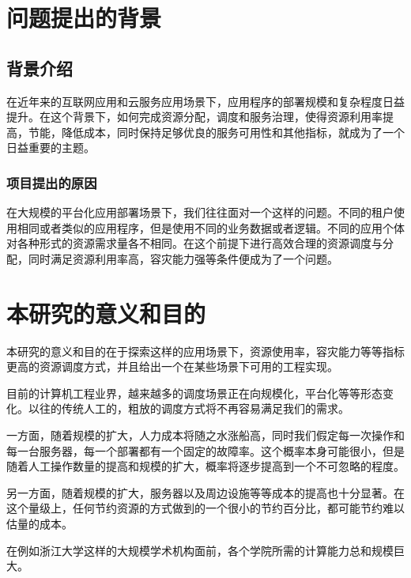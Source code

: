 \section{问题提出的背景}


\subsection{背景介绍}

在近年来的互联网应用和云服务应用场景下，应用程序的部署规模和复杂程度日益提升。在这个背景下，如何完成资源分配，调度和服务治理，使得资源利用率提高，节能，降低成本，同时保持足够优良的服务可用性和其他指标，就成为了一个日益重要的主题。

\subsubsection{项目提出的原因}

在大规模的平台化应用部署场景下，我们往往面对一个这样的问题。不同的租户使用相同或者类似的应用程序，但是使用不同的业务数据或者逻辑。不同的应用个体对各种形式的资源需求量各不相同。在这个前提下进行高效合理的资源调度与分配，同时满足资源利用率高，容灾能力强等条件便成为了一个问题。

\section{本研究的意义和目的}

本研究的意义和目的在于探索这样的应用场景下，资源使用率，容灾能力等等指标更高的资源调度方式，并且给出一个在某些场景下可用的工程实现。

目前的计算机工程业界，越来越多的调度场景正在向规模化，平台化等等形态变化。以往的传统人工的，粗放的调度方式将不再容易满足我们的需求。

一方面，随着规模的扩大，人力成本将随之水涨船高，同时我们假定每一次操作和每一台服务器，每一个部署都有一个固定的故障率。这个概率本身可能很小，但是随着人工操作数量的提高和规模的扩大，概率将逐步提高到一个不可忽略的程度。

另一方面，随着规模的扩大，服务器以及周边设施等等成本的提高也十分显著。在这个量级上，任何节约资源的方式做到的一个很小的节约百分比，都可能节约难以估量的成本。

在例如浙江大学这样的大规模学术机构面前，各个学院所需的计算能力总和规模巨大。

